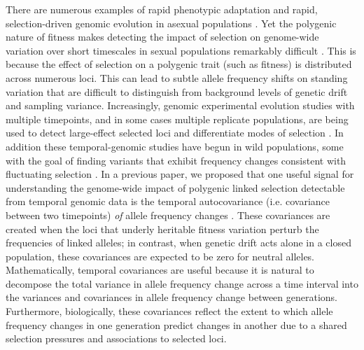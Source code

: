\documentclass[9pt,twocolumn,twoside]{pnas-new}
\newcommand{\vb}[1]{{\it \color{red} #1}}
\begin{document}
There are numerous examples of rapid phenotypic adaptation
\cite{Grant2011-wk,Grant2006-hj,Reznick1997-mh,Franks2007-dr} and rapid,
selection-driven genomic evolution in asexual populations
\cite{Good2017-om,Bennett1990-bc,Baym2016-kh}.  Yet the polygenic nature of
fitness makes detecting the impact of selection on genome-wide variation over
short timescales in sexual populations remarkably difficult \cite{Latta1998-me,
Pritchard2010-tk,Kemper2014-bx}. This is because the effect of selection on a
polygenic trait (such as fitness) is distributed across numerous loci. This can
lead to subtle allele frequency shifts on standing variation that are difficult
to distinguish from background levels of genetic drift and sampling variance.
Increasingly, genomic experimental evolution studies with multiple timepoints,
and in some cases multiple replicate populations, are being used to detect
large-effect selected loci \cite{Turner2011-sx,Turner2012-bm} and differentiate
modes of selection \cite{Burke2010-tz,Barghi2019-qy,Therkildsen2019-zy}.  In
addition these temporal-genomic studies have begun in wild populations, some
with the goal of finding variants that exhibit frequency changes consistent
with fluctuating selection \cite{Bergland2014-ij,Machado2018-cs}. In a previous
paper, we proposed that one useful signal for understanding the genome-wide
impact of polygenic linked selection detectable from temporal genomic data is
the temporal autocovariance (i.e. covariance between two timepoints) \vb{of}
allele frequency changes \cite{Buffalo2019-io}. These covariances are created
when the loci that underly heritable fitness variation perturb the frequencies
of linked alleles; in contrast, when genetic drift acts alone in a closed
population, these covariances are expected to be zero for neutral alleles.
Mathematically, temporal covariances are useful because it is natural to
decompose the total variance in allele frequency change across a time interval
into the variances and covariances in allele frequency change between
generations.  Furthermore, biologically, these covariances reflect the extent
to which allele frequency changes in one generation predict changes in another
due to a shared selection pressures and associations to selected loci.
\end{document}
